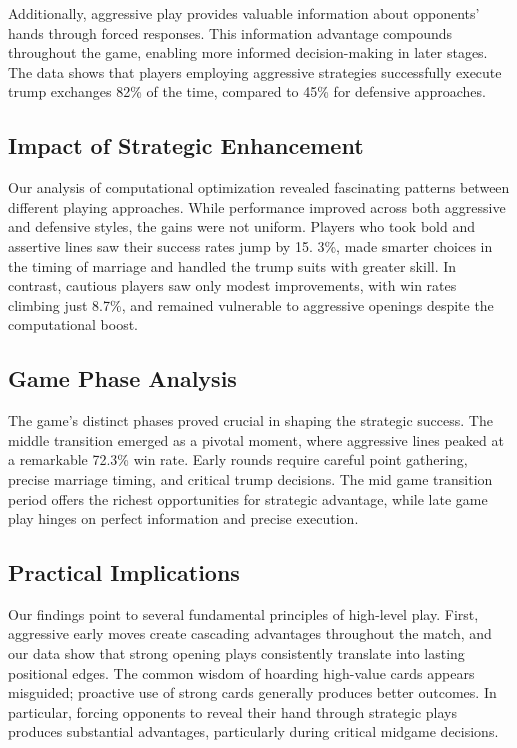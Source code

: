 \documentclass[runningheads]{llncs}
\begin{document}
Additionally, aggressive play provides valuable information about opponents' hands through forced responses. This information advantage compounds throughout the game, enabling more informed decision-making in later stages. The data shows that players employing aggressive strategies successfully execute trump exchanges 82\% of the time, compared to 45\% for defensive approaches.

\subsection{Impact of Strategic Enhancement}
Our analysis of computational optimization \cite{ref_ieee_card} revealed fascinating patterns between different playing approaches. While performance improved across both aggressive and defensive styles, the gains were not uniform. Players who took bold and assertive lines saw their success rates jump by 15. 3\%, made smarter choices in the timing of marriage and handled the trump suits with greater skill. In contrast, cautious players saw only modest improvements, with win rates climbing just 8.7\%, and remained vulnerable to aggressive openings despite the computational boost.

\subsection{Game Phase Analysis}
The game's distinct phases proved crucial in shaping the strategic success. The middle transition emerged as a pivotal moment, where aggressive lines peaked at a remarkable 72.3\% win rate. Early rounds require careful point gathering, precise marriage timing, and critical trump decisions. The mid game transition period offers the richest opportunities for strategic advantage, while late game play hinges on perfect information and precise execution.

\subsection{Practical Implications}
Our findings point to several fundamental principles of high-level play. First, aggressive early moves create cascading advantages throughout the match, and our data show that strong opening plays consistently translate into lasting positional edges. The common wisdom of hoarding high-value cards appears misguided; proactive use of strong cards generally produces better outcomes. In particular, forcing opponents to reveal their hand through strategic plays produces substantial advantages, particularly during critical midgame decisions.
\end{document}
